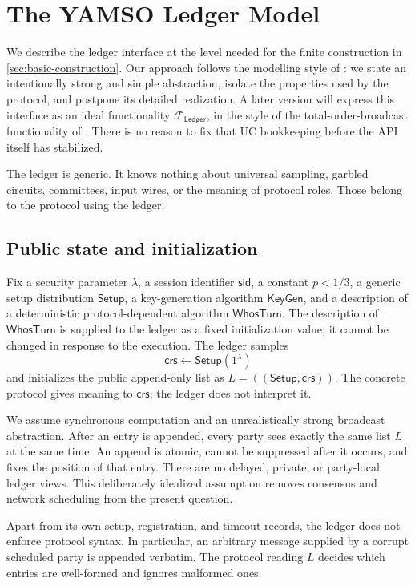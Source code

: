 \section{The YAMSO Ledger Model}
\label{sec:model}

We describe the ledger interface at the level needed for the finite
construction in \cref{sec:basic-construction}. Our approach follows the
modelling style of \cite[Section~2.1]{DinsdaleYoungEtAl2020Afgjort}: we state
an intentionally strong and simple abstraction, isolate the properties used
by the protocol, and postpone its detailed realization. A later version will
express this interface as an ideal functionality
$\mathcal F_{\mathsf{Ledger}}$, in the style of the total-order-broadcast
functionality of \cite{DamgardEtAl2025AsyncYOSO}. There is no reason to fix
that UC bookkeeping before the API itself has stabilized.

The ledger is generic. It knows nothing about universal sampling, garbled
circuits, committees, input wires, or the meaning of protocol roles. Those
belong to the protocol using the ledger.

\subsection{Public state and initialization}

Fix a security parameter $\lambda$, a session identifier $\mathsf{sid}$, a
constant $p<1/3$, a generic setup distribution $\mathsf{Setup}$, a
key-generation algorithm $\mathsf{KeyGen}$, and a description of a deterministic
protocol-dependent algorithm $\mathsf{WhosTurn}$. The description of
$\mathsf{WhosTurn}$ is supplied to the ledger as a fixed initialization value;
it cannot be changed in response to the execution. The ledger samples
\[
  \mathsf{crs}\leftarrow\mathsf{Setup}(1^\lambda)
\]
and initializes the public append-only list as
$L=((\mathsf{Setup},\mathsf{crs}))$. The concrete protocol gives meaning to
$\mathsf{crs}$; the ledger does not interpret it.

We assume synchronous computation and an unrealistically strong broadcast
abstraction. After an entry is appended, every party sees exactly the same
list $L$ at the same time. An append is atomic, cannot be suppressed after
it occurs, and fixes the position of that entry. There are no delayed,
private, or party-local ledger views. This deliberately idealized assumption
removes consensus and network scheduling from the present question.

Apart from its own setup, registration, and timeout records, the ledger does
not enforce protocol syntax. In particular, an arbitrary message supplied by
a corrupt scheduled party is appended verbatim. The protocol reading $L$
decides which entries are well-formed and ignores malformed ones.

